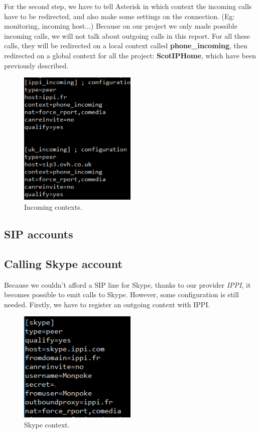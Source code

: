 For the second step, we have to tell Asterisk in which context the incoming calls have to be redirected, and also make some settings on the connection. (Eg: monitoring, incoming host...)
Because on our project we only made possible incoming calls, we will not talk about outgoing calls in this report. For all these calls, they will be redirected on a local context called \textbf{phone\_incoming}, then redirected on a global context for all the project: \textbf{ScotIPHome}, which have been previously described.

\begin{figure}[H]
  \caption{Incoming contexts.}
  \centering
    \includegraphics[width=0.5\textwidth]{img/contextsphones.png}
\end{figure}

\subsection{SIP accounts}


\subsection{Calling Skype account}
Because we couldn't afford a SIP line for Skype, thanks to our provider \textit{IPPI}, it becomes possible to emit calls to Skype. However, some configuration is still needed. Firstly, we have to register an outgoing context with IPPI.

\begin{figure}[H]
  \caption{Skype context.}
  \centering
    \includegraphics[width=0.5\textwidth]{img/skypeout.png}
\end{figure}

